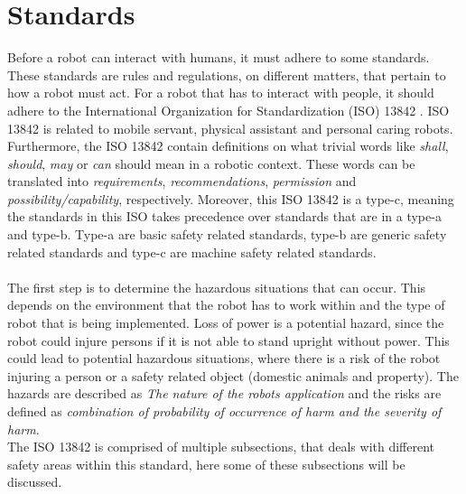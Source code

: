 \chapter{Standards}\label{ch:Standards}
Before a robot can interact with humans, it must adhere to some standards. These standards are rules and regulations, on different matters, that pertain to how a robot must act. For a robot that has to interact with people, it should adhere to the International Organization for Standardization (ISO) 13842 \cite{ISO13842}. ISO 13842 is related to mobile servant, physical assistant and personal caring robots. Furthermore, the ISO 13842 contain definitions on what trivial words like \textit{shall}, \textit{should}, \textit{may} or \textit{can} should mean in a robotic context. These words can be translated into \textit{requirements}, \textit{recommendations}, \textit{permission} and \textit{possibility/capability}, respectively. Moreover, this ISO 13842 is a type-c, meaning the standards in this ISO takes precedence over standards that are in a type-a and type-b. Type-a are basic safety related standards, type-b are generic safety related standards and type-c are machine safety related standards\cite{TYPEABC}.\\
\\
The first step is to determine the hazardous situations that can occur. This depends on the environment that the robot has to work within and the type of robot that is being implemented. Loss of power is a potential hazard, since the robot could injure persons if it is not able to stand upright without power. This could lead to potential hazardous situations, where there is a risk of the robot injuring a person or a safety related object (domestic animals and property). The hazards are described as \textit{The nature of the robots application}\cite{ISO13842} and the risks are defined as \textit{combination of probability of occurrence of harm and the severity of harm}\cite{ISO13842}.\\
The ISO 13842 is comprised of multiple subsections, that deals with different safety areas within this standard, here some of these subsections will be discussed.\\
\\
